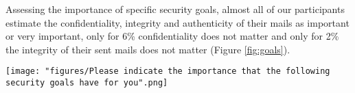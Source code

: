 Assessing the importance of specific security goals, almost all of our participants estimate the confidentiality, integrity and authenticity of their mails as important or very important, only for 6\% confidentiality does not matter and only for 2\% the integrity of their sent mails does not matter (Figure \ref{fig:goals}).\\
\begin{figure*}
	\texttt{[image: "figures/Please indicate the importance that the following security goals have for you".png]}
	\centering
	\caption{Please indicate the importance that the following security goals have for you}
	\label{fig:goals}
\end{figure*}\\